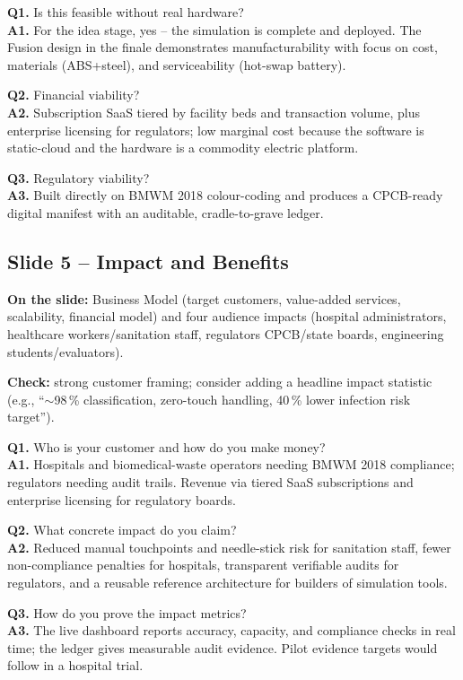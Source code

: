 \documentclass[11pt, a4paper]{article}
\begin{document}
\begin{qabox}
\textbf{Q1.} Is this feasible without real hardware?\\
\textbf{A1.} For the idea stage, yes -- the simulation is complete and
deployed. The Fusion design in the finale demonstrates manufacturability with
focus on cost, materials (ABS+steel), and serviceability (hot-swap battery).

\textbf{Q2.} Financial viability?\\
\textbf{A2.} Subscription SaaS tiered by facility beds and transaction volume,
plus enterprise licensing for regulators; low marginal cost because the
software is static-cloud and the hardware is a commodity electric platform.

\textbf{Q3.} Regulatory viability?\\
\textbf{A3.} Built directly on BMWM 2018 colour-coding and produces a
CPCB-ready digital manifest with an auditable, cradle-to-grave ledger.
\end{qabox}

\subsection{Slide 5 -- Impact and Benefits}
\textbf{On the slide:} Business Model (target customers, value-added services,
scalability, financial model) and four audience impacts (hospital
administrators, healthcare workers/sanitation staff, regulators CPCB/state
boards, engineering students/evaluators).

\textbf{Check:} strong customer framing; consider adding a headline impact
statistic (e.g., ``$\sim$98\,\% classification, zero-touch handling,
40\,\% lower infection risk target'').

\begin{qabox}
\textbf{Q1.} Who is your customer and how do you make money?\\
\textbf{A1.} Hospitals and biomedical-waste operators needing BMWM 2018
compliance; regulators needing audit trails. Revenue via tiered SaaS
subscriptions and enterprise licensing for regulatory boards.

\textbf{Q2.} What concrete impact do you claim?\\
\textbf{A2.} Reduced manual touchpoints and needle-stick risk for sanitation
staff, fewer non-compliance penalties for hospitals, transparent verifiable
audits for regulators, and a reusable reference architecture for builders of
simulation tools.

\textbf{Q3.} How do you prove the impact metrics?\\
\textbf{A3.} The live dashboard reports accuracy, capacity, and compliance
checks in real time; the ledger gives measurable audit evidence. Pilot
evidence targets would follow in a hospital trial.
\end{qabox}
\end{document}
